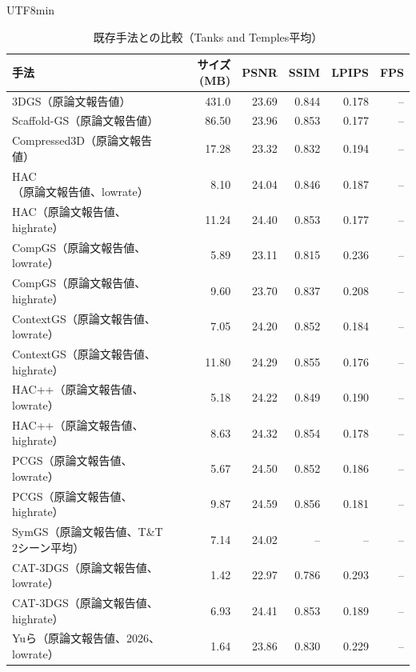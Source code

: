 \documentclass{ieeeaccess}
\begin{document}
\begin{CJK}{UTF8}{min}
\begin{table}[!t]
\renewcommand{\arraystretch}{1.2}
\caption{既存手法との比較（Tanks and Temples平均）}
\label{tab:literature-result}
\centering
\begin{tabular}{p{5.2cm}rrrrr}
\toprule
手法 & サイズ (MB) & PSNR & SSIM & LPIPS & FPS \\
\midrule
3DGS\cite{kerbl20233d}（原論文報告値） & 431.0 & 23.69 & 0.844 & 0.178 & -- \\
Scaffold-GS\cite{lu2024scaffold}（原論文報告値） & 86.50 & 23.96 & 0.853 & 0.177 & -- \\
Compressed3D\cite{niedermayr2024compressed}（原論文報告値） & 17.28 & 23.32 & 0.832 & 0.194 & -- \\
HAC\cite{chen2024hac}（原論文報告値、lowrate） & 8.10 & 24.04 & 0.846 & 0.187 & -- \\
HAC\cite{chen2024hac}（原論文報告値、highrate） & 11.24 & 24.40 & 0.853 & 0.177 & -- \\
CompGS\cite{liu2024compgs}（原論文報告値、lowrate） & 5.89 & 23.11 & 0.815 & 0.236 & -- \\
CompGS\cite{liu2024compgs}（原論文報告値、highrate） & 9.60 & 23.70 & 0.837 & 0.208 & -- \\
ContextGS\cite{wang2024contextgs}（原論文報告値、lowrate） & 7.05 & 24.20 & 0.852 & 0.184 & -- \\
ContextGS\cite{wang2024contextgs}（原論文報告値、highrate） & 11.80 & 24.29 & 0.855 & 0.176 & -- \\
HAC++\cite{chen2025hacpp}（原論文報告値、lowrate） & 5.18 & 24.22 & 0.849 & 0.190 & -- \\
HAC++\cite{chen2025hacpp}（原論文報告値、highrate） & 8.63 & 24.32 & 0.854 & 0.178 & -- \\
PCGS\cite{chen2025pcgs}（原論文報告値、lowrate） & 5.67 & 24.50 & 0.852 & 0.186 & -- \\
PCGS\cite{chen2025pcgs}（原論文報告値、highrate） & 9.87 & 24.59 & 0.856 & 0.181 & -- \\
SymGS\cite{gupta2025symgs}（原論文報告値、T\&T 2シーン平均） & 7.14 & 24.02 & -- & -- & -- \\
CAT-3DGS\cite{zhan2025cat3dgs}（原論文報告値、lowrate） & 1.42 & 22.97 & 0.786 & 0.293 & -- \\
CAT-3DGS\cite{zhan2025cat3dgs}（原論文報告値、highrate） & 6.93 & 24.41 & 0.853 & 0.189 & -- \\
Yuら\cite{yu2026practical}（原論文報告値、2026、lowrate） & 1.64 & 23.86 & 0.830 & 0.229 & -- \\

\end{tabular}
\end{table}
\end{CJK}
\end{document}
